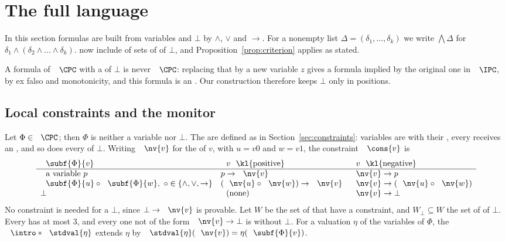 \section{The full language}\label{sec:full}

In this section formulas are built from variables and $\bot$ by $\wedge$,
$\vee$ and $\to$. For a nonempty list $\Delta=(\delta_1,\dots,\delta_k)$ we
write $\bigwedge\Delta$ for $\delta_1\wedge(\delta_2\wedge\dots\wedge\delta_k)$.
 now include  of sets of
 of $\bot$, and Proposition~\ref{prop:criterion} applies as
stated.

A formula of $\CPC$ with a   of $\bot$ is never
 $\CPC$: replacing that  by a new variable $z$
gives a formula implied by the original one in $\IPC$, by ex falso and
monotonicity, and this formula is an . Our construction
therefore keeps $\bot$ only in  positions.

\subsection{Local constraints and the monitor}

Let $\Phi\in\CPC$; then $\Phi$ is neither a variable nor $\bot$. The
 are defined as in Section~\ref{sec:constraints}:
variables are  with their , every
 receives an , and so does
every  of $\bot$. Writing $\nv{v}$ for the 
of $v$, with $u=v0$ and $w=v1$, the constraint $\cons{v}$ is
\[
\begin{array}{lll}
\subf{\Phi}{v} & \text{$v$ \kl{positive}} & \text{$v$ \kl{negative}}\\\hline
\text{a variable }p & p\to\nv{v} & \nv{v}\to p\\
\subf{\Phi}{u}\circ\subf{\Phi}{w},\ \circ\in\{\wedge,\vee,\to\}
 & (\nv{u}\circ\nv{w})\to\nv{v} & \nv{v}\to(\nv{u}\circ\nv{w})\\
\bot & \text{(none)} & \nv{v}\to\bot
\end{array}
\]
No constraint is needed for a  $\bot$, since $\bot\to\nv{v}$ is
provable. Let $W$ be the set of  that have a constraint, and
$W_\bot\subseteq W$ the set of   of $\bot$.
Every  has  at most $3$, and every one not of
the form $\nv{v}\to\bot$ is  without $\bot$. \AP For a
valuation $\eta$ of the variables of $\Phi$, the 
$\intro*\stdval{\eta}$ extends $\eta$ by
$\stdval{\eta}(\nv{v})=\eta(\subf{\Phi}{v})$.

